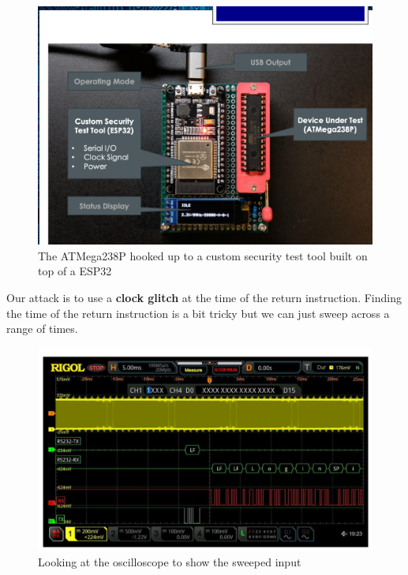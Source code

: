 \documentclass[../notes.tex]{subfiles}
\begin{document}
\begin{figure}[H]
    \centering
    \includegraphics[width=0.8\linewidth]{img/image_2023-01-23-19-45-52.png}
    \caption{The ATMega238P hooked up to a custom security test tool built on top of a ESP32}
\end{figure}


Our attack is to use a \textbf{clock glitch} at the time of the return instruction.
Finding the time of the return instruction is a bit tricky but we can just sweep across a range of times.



\begin{figure}[H]
    \centering
    \includegraphics[width=0.8\linewidth]{img/image_2023-01-23-19-52-22.png}
    \caption{Looking at the oscilloscope to show the sweeped input}
\end{figure}
\end{document}
